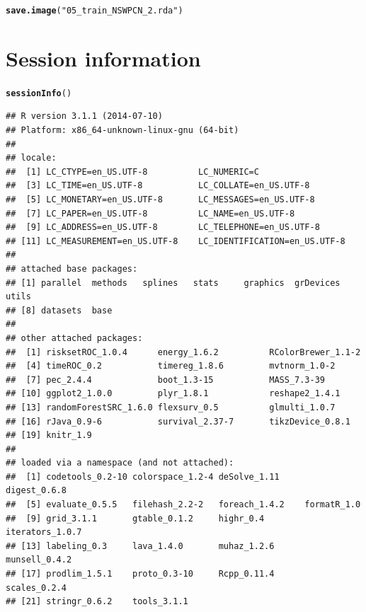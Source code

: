 \documentclass{article}\usepackage[]{graphicx}\usepackage[]{color}
\makeatletter
\newcommand{\hlstr}[1]{\textcolor[rgb]{0.192,0.494,0.8}{#1}}%
\newcommand{\hlstd}[1]{\textcolor[rgb]{0.345,0.345,0.345}{#1}}%
\newcommand{\hlkwd}[1]{\textcolor[rgb]{0.737,0.353,0.396}{\textbf{#1}}}%
\newenvironment{kframe}{%
 \def\at@end@of@kframe{}%
 \ifinner\ifhmode%
  \def\at@end@of@kframe{\end{minipage}}%
  \begin{minipage}{\columnwidth}%
 \fi\fi%
 \def\FrameCommand##1{\hskip\@totalleftmargin \hskip-\fboxsep
 \colorbox{shadecolor}{##1}\hskip-\fboxsep
     \hskip-\linewidth \hskip-\@totalleftmargin \hskip\columnwidth}%
 \MakeFramed {\advance\hsize-\width
   \@totalleftmargin\z@ \linewidth\hsize
   \@setminipage}}%
 {\par\unskip\endMakeFramed%
 \at@end@of@kframe}
\newenvironment{knitrout}{}{} %
\makeatother
\begin{document}
\begin{knitrout}
\color{fgcolor}\begin{kframe}
\begin{alltt}
\hlkwd{save.image}\hlstd{(}\hlstr{"05_train_NSWPCN_2.rda"}\hlstd{)}
\end{alltt}
\end{kframe}
\end{knitrout}

\section{Session information}
\begin{knitrout}
\color{fgcolor}\begin{kframe}
\begin{alltt}
\hlkwd{sessionInfo}\hlstd{()}
\end{alltt}
\begin{verbatim}
## R version 3.1.1 (2014-07-10)
## Platform: x86_64-unknown-linux-gnu (64-bit)
## 
## locale:
##  [1] LC_CTYPE=en_US.UTF-8          LC_NUMERIC=C                 
##  [3] LC_TIME=en_US.UTF-8           LC_COLLATE=en_US.UTF-8       
##  [5] LC_MONETARY=en_US.UTF-8       LC_MESSAGES=en_US.UTF-8      
##  [7] LC_PAPER=en_US.UTF-8          LC_NAME=en_US.UTF-8          
##  [9] LC_ADDRESS=en_US.UTF-8        LC_TELEPHONE=en_US.UTF-8     
## [11] LC_MEASUREMENT=en_US.UTF-8    LC_IDENTIFICATION=en_US.UTF-8
## 
## attached base packages:
## [1] parallel  methods   splines   stats     graphics  grDevices utils    
## [8] datasets  base     
## 
## other attached packages:
##  [1] risksetROC_1.0.4      energy_1.6.2          RColorBrewer_1.1-2   
##  [4] timeROC_0.2           timereg_1.8.6         mvtnorm_1.0-2        
##  [7] pec_2.4.4             boot_1.3-15           MASS_7.3-39          
## [10] ggplot2_1.0.0         plyr_1.8.1            reshape2_1.4.1       
## [13] randomForestSRC_1.6.0 flexsurv_0.5          glmulti_1.0.7        
## [16] rJava_0.9-6           survival_2.37-7       tikzDevice_0.8.1     
## [19] knitr_1.9            
## 
## loaded via a namespace (and not attached):
##  [1] codetools_0.2-10 colorspace_1.2-4 deSolve_1.11     digest_0.6.8    
##  [5] evaluate_0.5.5   filehash_2.2-2   foreach_1.4.2    formatR_1.0     
##  [9] grid_3.1.1       gtable_0.1.2     highr_0.4        iterators_1.0.7 
## [13] labeling_0.3     lava_1.4.0       muhaz_1.2.6      munsell_0.4.2   
## [17] prodlim_1.5.1    proto_0.3-10     Rcpp_0.11.4      scales_0.2.4    
## [21] stringr_0.6.2    tools_3.1.1
\end{verbatim}
\end{kframe}
\end{knitrout}
\end{document}
